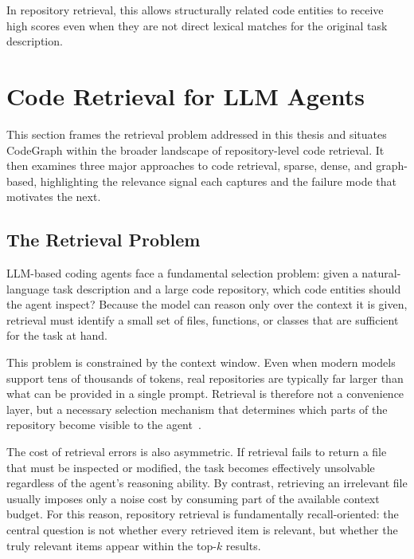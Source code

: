 In repository retrieval, this allows structurally related code entities to receive high scores even when they are not direct lexical matches for the original task description.

\section{Code Retrieval for LLM Agents}
\label{sec:related-work}

This section frames the retrieval problem addressed in this thesis and situates CodeGraph within the broader landscape of repository-level code retrieval. It then examines three major approaches to code retrieval, sparse, dense, and graph-based, highlighting the relevance signal each captures and the failure mode that motivates the next.

\subsection{The Retrieval Problem}
\label{sec:retrieval-problem}

LLM-based coding agents face a fundamental selection problem: given a natural-language task description and a large code repository, which code entities should the agent inspect? Because the model can reason only over the context it is given, retrieval must identify a small set of files, functions, or classes that are sufficient for the task at hand.

This problem is constrained by the context window. Even when modern models support tens of thousands of tokens, real repositories are typically far larger than what can be provided in a single prompt. Retrieval is therefore not a convenience layer, but a necessary selection mechanism that determines which parts of the repository become visible to the agent~\cite{gpt4,claude3}.

The cost of retrieval errors is also asymmetric. If retrieval fails to return a file that must be inspected or modified, the task becomes effectively unsolvable regardless of the agent's reasoning ability. By contrast, retrieving an irrelevant file usually imposes only a noise cost by consuming part of the available context budget. For this reason, repository retrieval is fundamentally recall-oriented: the central question is not whether every retrieved item is relevant, but whether the truly relevant items appear within the top-$k$ results.


